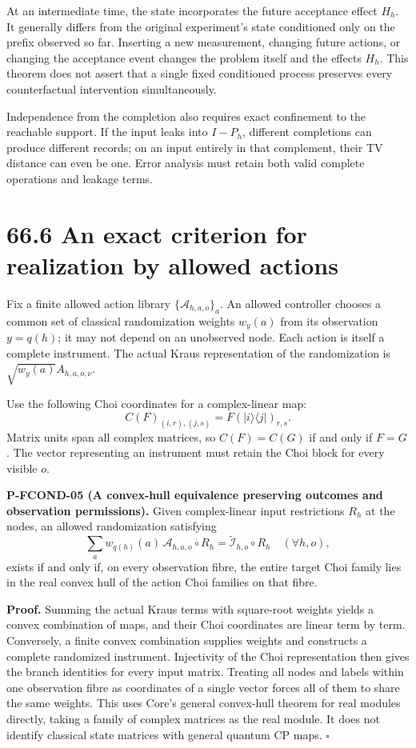 \documentclass[
  11pt,
  oneside]{book}
\begin{document}
At an intermediate time, the state incorporates the future acceptance
effect \(H_h\). It generally differs from the original experiment's
state conditioned only on the prefix observed so far. Inserting a new
measurement, changing future actions, or changing the acceptance event
changes the problem itself and the effects \(H_h\). This theorem does
not assert that a single fixed conditioned process preserves every
counterfactual intervention simultaneously.

Independence from the completion also requires exact confinement to the
reachable support. If the input leaks into \(I-P_h\), different
completions can produce different records; on an input entirely in that
complement, their TV distance can even be one. Error analysis must
retain both valid complete operations and leakage terms.

\section{66.6 An exact criterion for realization by allowed actions}

Fix a finite allowed action library \(\{\mathcal A_{h,a,o}\}_a\). An
allowed controller chooses a common set of classical randomization
weights \(w_y(a)\) from its observation \(y=q(h)\); it may not depend on
an unobserved node. Each action is itself a complete instrument. The
actual Kraus representation of the randomization is
\(\sqrt{w_y(a)}A_{h,a,o,\nu}\).

Use the following Choi coordinates for a complex-linear map: \[
C(F)_{(i,r),(j,s)}=F(|i\rangle\langle j|)_{r,s}.
\] Matrix units span all complex matrices, so \(C(F)=C(G)\) if and only
if \(F=G\). The vector representing an instrument must retain the Choi
block for every visible \(o\).

\label{p-fcond-05}{} \textbf{P-FCOND-05 (A convex-hull
equivalence preserving outcomes and observation permissions).} Given
complex-linear input restrictions \(R_h\) at the nodes, an allowed
randomization satisfying \[
\sum_a w_{q(h)}(a)\,\mathcal A_{h,a,o}\circ R_h
=\widetilde{\mathcal I}_{h,o}\circ R_h\quad(\forall h,o),
\] exists if and only if, on every observation fibre, the entire target
Choi family lies in the real convex hull of the action Choi families on
that fibre.

\textbf{Proof.} Summing the actual Kraus terms with square-root weights
yields a convex combination of maps, and their Choi coordinates are
linear term by term. Conversely, a finite convex combination supplies
weights and constructs a complete randomized instrument. Injectivity of
the Choi representation then gives the branch identities for every input
matrix. Treating all nodes and labels within one observation fibre as
coordinates of a single vector forces all of them to share the same
weights. This uses Core's general convex-hull theorem for real modules
directly, taking a family of complex matrices as the real module. It
does not identify classical state matrices with general quantum CP maps.
\(\square\)
\end{document}
